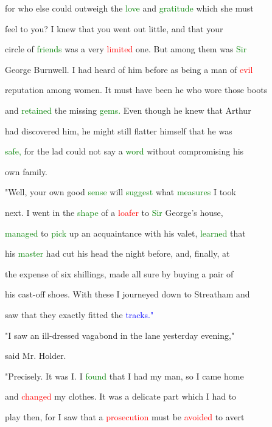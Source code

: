 for who else could outweigh the \textcolor{green}{love} and \textcolor{green}{gratitude} which she must

 feel to you? I knew that you went out little, and that your

 circle of \textcolor{green}{friends} was a very \textcolor{red}{limited} one. But among them was \textcolor{green}{Sir}

 George Burnwell. I had heard of him before as being a man of \textcolor{red}{evil}

 reputation among women. It must have been he who wore those boots

 and \textcolor{green}{retained} the missing \textcolor{green}{gems.} Even though he knew that Arthur

 had discovered him, he might still flatter himself that he was

 \textcolor{green}{safe,} for the lad could not say a \textcolor{green}{word} without compromising his

 own family.



 "Well, your own \textcolor{BurntOrange}{good} \textcolor{green}{sense} will \textcolor{green}{suggest} what \textcolor{green}{measures} I took

 next. I went in the \textcolor{green}{shape} of a \textcolor{red}{loafer} to \textcolor{green}{Sir} George's house,

 \textcolor{green}{managed} to \textcolor{green}{pick} up an acquaintance with his valet, \textcolor{green}{learned} that

 his \textcolor{green}{master} had cut his head the night before, and, \textcolor{BurntOrange}{finally,} at

 the expense of six shillings, made all sure by buying a pair of

 his cast-off shoes. With these I journeyed down to Streatham and

 saw that they exactly fitted the \textcolor{blue}{tracks."}



 "I saw an ill-dressed vagabond in the lane yesterday evening,"

 said Mr. Holder.



 "Precisely. It was I. I \textcolor{green}{found} that I had my man, so I came home

 and \textcolor{red}{changed} my clothes. It was a delicate part which I had to

 play then, for I saw that a \textcolor{red}{prosecution} must be \textcolor{red}{avoided} to avert

